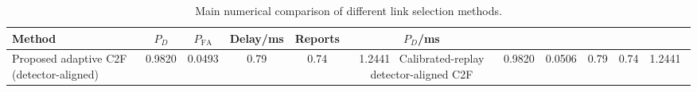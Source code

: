 \begin{table}[t]
    \centering
    \caption{Main numerical comparison of different link selection methods.}
    \label{tab:main_summary}
    \begin{tabular}{l c c c c c}
        \hline
        Method & $P_D$ & $P_{\mathrm{FA}}$ & Delay/ms & Reports & $P_D$/ms \\
        \hline
        Proposed adaptive C2F (detector-aligned) & 0.9820 & 0.0493 & 0.79 & 0.74 & 1.2441 \
        Calibrated-replay detector-aligned C2F & 0.9820 & 0.0506 & 0.79 & 0.74 & 1.2441 \
        \hline
    \end{tabular}
\end{table}
